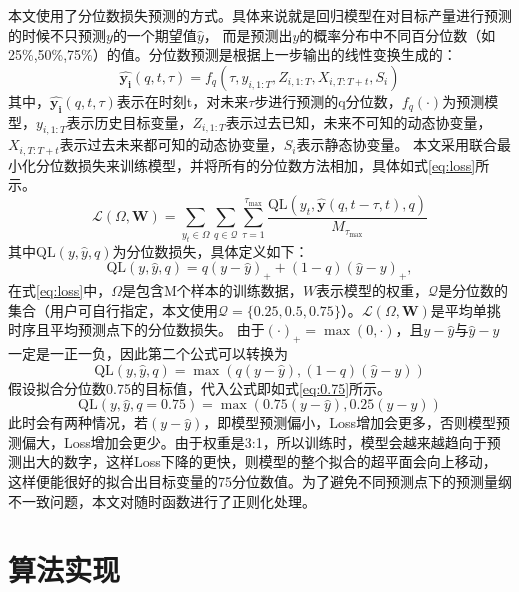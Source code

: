 本文使用了分位数损失预测的方式。具体来说就是回归模型在对目标产量进行预测的时候不只预测$y$的一个期望值$\hat{y}$，
而是预测出$y$的概率分布中不同百分位数（如25\%,50\%,75\%）的值。分位数预测是根据上一步输出的线性变换生成的：
\begin{equation}
    \hat{\boldsymbol{y_i}}(q, t, \tau) = f_q (\tau, y_{i,1:T}, Z_{i,1:T}, X_{i,T:T+t}, S_i)
\end{equation}
其中，$\hat{\boldsymbol{y_i}}(q, t, \tau)$表示在时刻t，对未来$\tau$步进行预测的q分位数，$f_q(\cdot)$为预测模型，$ y_{i,1:T}$表示历史目标变量，$Z_{i,1:T}$表示过去已知，未来不可知的动态协变量，$X_{i,T:T+t}$表示过去未来都可知的动态协变量，$S_i$表示静态协变量。
本文采用联合最小化分位数损失来训练模型，并将所有的分位数方法相加，具体如式\eqref{eq:loss}所示。
\begin{equation}
    \mathcal{L}(\Omega, \mathbf{W}) = \sum_{y_t \in \Omega} \sum_{q \in \mathcal{Q} } \sum_{\tau=1}^{\tau_{\max}} \frac{\text{QL}(y_t, \hat{\boldsymbol{y}}(q, t - \tau, t), q)}{M_{\tau_{\max}}}
    \label{eq:loss}
\end{equation}
其中$\text{QL}(y,\hat{y},q)$为分位数损失，具体定义如下：
\begin{equation}
    \text{QL}(y, \hat{y}, q) = q(y - \hat{y})_+ + (1 - q)(\hat{y} - y)_+,
\end{equation}
在式\eqref{eq:loss}中，$\Omega$是包含M个样本的训练数据，$W$表示模型的权重，$\mathcal{Q}$是分位数的集合（用户可自行指定，本文使用$\mathcal{Q} = \{0.25,0.5,0.75\}$）。$\mathcal{L}(\Omega, \mathbf{W})$是平均单挑时序且平均预测点下的分位数损失。
由于$(\cdot)_+ = \max(0, \cdot)$，且$y-\hat{y}$与$\hat{y}-y$一定是一正一负，因此第二个公式可以转换为
\begin{equation}
    \text{QL}(y, \hat{y}, q) =  \max(q(y - \hat{y} ), (1 - q)(\hat{y} - y))
\end{equation}
假设拟合分位数0.75的目标值，代入公式即如式\eqref{eq:0.75}所示。
\begin{equation}
    \text{QL}(y, \hat{y}, q=0.75) =  \max(0.75(y - \hat{y} ), 0.25(\hat{y} - y))
    \label{eq:0.75}
\end{equation}
此时会有两种情况，若$(y - \hat{y} )$，即模型预测偏小，Loss增加会更多，否则模型预测偏大，Loss增加会更少。由于权重是3:1，所以训练时，模型会越来越趋向于预测出大的数字，这样Loss下降的更快，则模型的整个拟合的超平面会向上移动，
这样便能很好的拟合出目标变量的75分位数值。为了避免不同预测点下的预测量纲不一致问题，本文对随时函数进行了正则化处理。
\section{算法实现}
